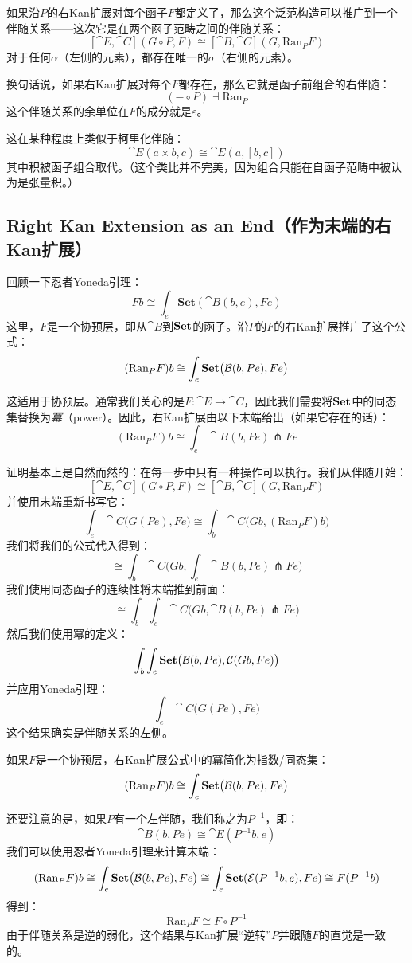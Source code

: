\documentclass[DaoFP]{subfiles}
\begin{document}
 如果沿$P$的右Kan扩展对每个函子$F$都定义了，那么这个泛范构造可以推广到一个伴随关系——这次它是在两个函子范畴之间的伴随关系：
 \[ [\cat E, \cat C](G \circ P, F) \cong [\cat B, \cat C](G, \text{Ran}_P F) \]
 对于任何$\alpha$（左侧的元素），都存在唯一的$\sigma$（右侧的元素）。

 换句话说，如果右Kan扩展对每个$F$都存在，那么它就是函子前组合的右伴随：
 \[ (- \circ P) \dashv \text{Ran}_P \]
 这个伴随关系的余单位在$F$的成分就是$\varepsilon$。

 这在某种程度上类似于柯里化伴随：
 \[ \cat E (a \times b, c) \cong \cat E (a, [b, c]) \]
 其中积被函子组合取代。（这个类比并不完美，因为组合只能在自函子范畴中被认为是张量积。）

 \subsection{Right Kan Extension as an End（作为末端的右Kan扩展）}

 回顾一下忍者Yoneda引理：
 \[ F b \cong \int_{e} \mathbf{Set} (\cat B(b, e), F e) \]
 这里，$F$是一个协预层，即从$\cat B$到$\mathbf{Set}$的函子。沿$P$的$F$的右Kan扩展推广了这个公式：
 \[ (\text{Ran}_P F) b \cong \int_e \mathbf{Set} \big( \mathcal{B} (b, P e), F e\big) \]

 这适用于协预层。通常我们关心的是$F \colon \cat E \to \cat C$，因此我们需要将$\mathbf{Set}$中的同态集替换为\emph{冪}（power）。因此，右Kan扩展由以下末端给出（如果它存在的话）：
 \[ (\text{Ran}_P F) b \cong \int_e \cat B (b, P e) \pitchfork F e \]

 证明基本上是自然而然的：在每一步中只有一种操作可以执行。我们从伴随开始：
 \[ [\cat E, \cat C](G \circ P, F) \cong [\cat B, \cat C](G, \text{Ran}_P F) \]
 并使用末端重新书写它：
 \[ \int_e \cat C \big(G ( P e), F e\big) \cong \int_b \cat C\big(G b, (\text{Ran}_P F) b\big) \]
 我们将我们的公式代入得到：
 \[ \cong  \int_b \cat C\big(G b,\int_e \cat B (b, P e) \pitchfork F e \big)\]
 我们使用同态函子的连续性将末端推到前面：
 \[  \cong  \int_b \int_e \cat C\big(G b, \cat B (b, P e) \pitchfork F e \big) \]
 然后我们使用冪的定义：
 \[ \int_b \int_e \mathbf{Set} \big(  \mathcal{B} (b, P e), \mathcal{C} (G b, F e) \big) \]
 并应用Yoneda引理：
 \[ \int_e  \cat C \big(G (P e), F e\big) \]
 这个结果确实是伴随关系的左侧。

 如果$F$是一个协预层，右Kan扩展公式中的冪简化为指数/同态集：
 \[ (\text{Ran}_P F) b \cong \int_e \mathbf{Set} \big( \mathcal{B} (b, P e), F e\big) \]

 还要注意的是，如果$P$有一个左伴随，我们称之为$P^{-1}$，即：
 \[ \cat B(b, P e) \cong \cat E(P^{-1} b, e) \]
 我们可以使用忍者Yoneda引理来计算末端：
 \[ (\text{Ran}_P F) b \cong \int_e \mathbf{Set} \big( \mathcal{B} (b, P e), F e\big) \cong \int_e \mathbf{Set}(\mathcal{E}(P^{-1} b, e), F e) \cong F(P^{-1} b)\]
 得到：
 \[  \text{Ran}_P F \cong F \circ P^{-1} \]
 由于伴随关系是逆的弱化，这个结果与Kan扩展“逆转”$P$并跟随$F$的直觉是一致的。
\end{document}
